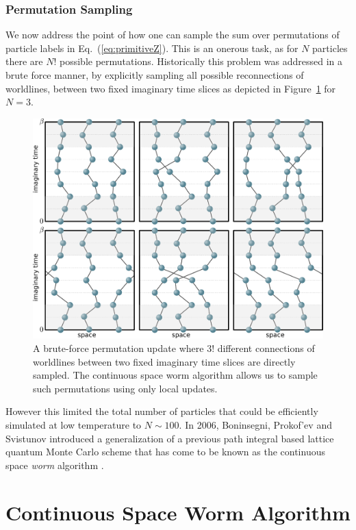 \documentclass[prb,aps,amssym,nofootinbib,floatfix,notitlepage]{revtex4-1}
\renewcommand{\eqref}[1]{Eq.~(\ref{#1})}
\begin{document}
\subsubsection{Permutation Sampling}
We now address the point of how one can sample the sum over permutations of
particle labels in \eqref{eq:primitiveZ}. This is an onerous task, as for $N$
particles there are $N!$ possible permutations.
Historically this problem was addressed in a brute force manner, by explicitly
sampling all possible reconnections of worldlines, between two fixed imaginary
time slices as depicted in Figure~\ref{fig:permute} for $N=3$. 
%
\begin{figure}
\begin{center}
\includegraphics[width=0.70\columnwidth]{Figures/permute.pdf}
\end{center}
\caption{A brute-force permutation update where $3!$ different connections of
    worldlines between two fixed imaginary time slices are
    directly sampled. The continuous space worm algorithm allows us to sample
    such permutations using only local updates.}
\label{fig:permute}
 \end{figure}
%
However this limited the total number of
particles that could be efficiently simulated at low temperature to $N \sim
100$. In 2006, Boninsegni, Prokof'ev and Svistunov introduced a generalization
of a previous path integral based lattice quantum Monte Carlo scheme
\cite{Prokofev:1998ux} that has come to be known as the continuous space
\emph{worm} algorithm \cite{Boninsegni:2006ed,Boninsegni:2006gc}.


\section{Continuous Space Worm Algorithm}
\end{document}

